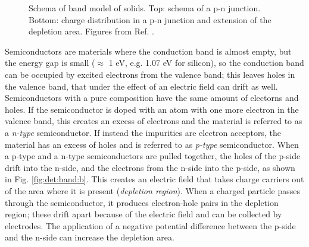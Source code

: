 \begin{figure}[ht]
\centering
{}
\caption{ Schema of band model of solids.  Top: schema of a p-n junction. Bottom: charge distribution in a p-n junction and extension of the depletion area. Figures from Ref. \cite{grupen_shwartz_2008}.}
\label{fig:det:band}
\end{figure}

Semiconductors are materials where the conduction band is almost empty, but the energy gap is small ($\approx$ 1 eV, e.g. 1.07 eV for silicon), so the conduction band can be occupied by excited electrons from the valence band; this leaves holes in the valence band, that under the effect of an electric field can drift as well. Semiconductors with a pure composition have the same amount of electorns and holes. If the semiconductor is doped with an atom with one more electron in the valence band, this creates an excess of electrons and the material is referred to as a \textit{n-type} semiconductor. If instead the impurities are electron acceptors, the material has an excess of holes and is referred to as \textit{p-type} semiconductor. When a p-type and a n-type semiconductors are pulled together, the holes of the p-side drift into the n-side, and the electrons from the n-side into the p-side, as shown in Fig. \ref{fig:det:band:b}. This creates an electric field that takes charge carriers out of the area where it is present (\textit{depletion region}). When a charged particle passes through the semiconductor, it produces electron-hole pairs in the depletion region; these drift apart because of the electric field and can be collected by electrodes. The application of a negative potential difference between the p-side and the n-side can increase the depletion area.

